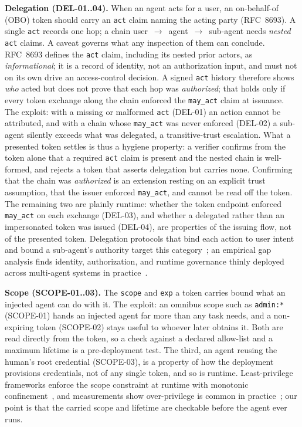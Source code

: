 \noindent\textbf{Delegation (DEL-01..04).} When an agent acts for a user, an
on-behalf-of (OBO) token should carry an \texttt{act} claim naming the acting party
(RFC~8693). A single \texttt{act} records one hop; a chain
user~$\rightarrow$~agent~$\rightarrow$~sub-agent needs \emph{nested} \texttt{act}
claims. A caveat governs what any inspection of them can conclude. RFC~8693 defines
the \texttt{act} claim, including its nested prior actors, as \emph{informational}; it
is a record of identity, not an authorization input, and must not on its own drive an
access-control decision. A signed \texttt{act} history therefore shows \emph{who}
acted but does not prove that each hop was \emph{authorized}; that holds only if every
token exchange along the chain enforced the \texttt{may\_act} claim at issuance. The
exploit: with a missing or malformed \texttt{act} (DEL-01) an action cannot be
attributed, and with a chain whose \texttt{may\_act} was never enforced (DEL-02) a
sub-agent silently exceeds what was delegated, a transitive-trust escalation. What a
presented token settles is thus a hygiene property: a verifier confirms from the token
alone that a required \texttt{act} claim is present and the nested chain is
well-formed, and rejects a token that asserts delegation but carries none. Confirming
that the chain was \emph{authorized} is an extension resting on an explicit trust
assumption, that the issuer enforced \texttt{may\_act}, and cannot be read off the
token. The remaining two are plainly runtime: whether the token endpoint enforced
\texttt{may\_act} on each exchange (DEL-03), and whether a delegated rather than an
impersonated token was issued (DEL-04), are properties of the issuing flow, not of the
presented token. Delegation protocols that bind each action to user intent and bound a
sub-agent's authority target this
category~\cite{agentauth2025agenticjwt,agentauth2026aip,agentauth2026boundedagents,agentauth2026aidguard};
an empirical gap analysis finds identity, authorization, and runtime governance thinly
deployed across multi-agent systems in practice~\cite{agentauth2026delegationwithouttrust}.

\noindent\textbf{Scope (SCOPE-01..03).} The \texttt{scope} and \texttt{exp} a token
carries bound what an injected agent can do with it. The exploit: an omnibus scope
such as \texttt{admin:*} (SCOPE-01) hands an injected agent far more than any task
needs, and a non-expiring token (SCOPE-02) stays useful to whoever later obtains it.
Both are read directly from the token, so a check against a declared allow-list and a
maximum lifetime is a pre-deployment test. The third, an agent reusing the human's
root credential (SCOPE-03), is a property of how the deployment provisions
credentials, not of any single token, and so is runtime. Least-privilege frameworks
enforce the scope constraint at runtime with monotonic
confinement~\cite{agentauth2025progent}, and measurements show over-privilege is
common in practice~\cite{agentauth2025privmgmtmcp}; our point is that the carried
scope and lifetime are checkable before the agent ever runs.

